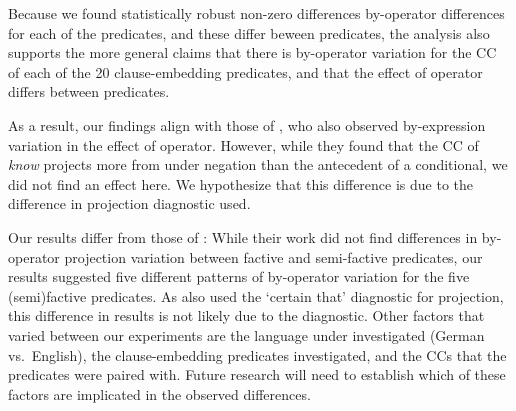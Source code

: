 \documentclass[a4paper,12pt,twoside]{article}
\newcommand{\posscite}[1]{\citeauthor{#1}'s (\citeyear{#1})}
\begin{document}
    Because we found statistically robust non-zero differences by-operator differences for each of the predicates, and these differ beween predicates, the analysis also supports the more general claims that there is by-operator variation for the CC of each of the 20 clause-embedding predicates, and that the effect of operator differs between predicates.
    
    As a result, our findings align with those of \citealt{smith_relationship_2014}, who also observed by-expression variation in the effect of operator. However, while they found that the CC of \emph{know} projects more from under negation than the antecedent of a conditional, we did not find an effect here. We hypothesize that this difference is due to the difference in projection diagnostic used. 

	Our results differ from those of \citealt{sieker_projective_2022}: While their work did not find differences in by-operator projection variation between factive and semi-factive predicates, our results suggested five different patterns of by-operator variation for the five (semi)factive predicates. As \citealt{sieker_projective_2022} also used the `certain that' diagnostic for projection, this difference in results is not likely due to the diagnostic. Other factors that varied between our experiments are the language under investigated (German vs.\ English), the clause-embedding predicates investigated, and the CCs that the predicates were paired with. Future research will need to establish which of these factors are implicated in the observed differences.
   
\end{document}
